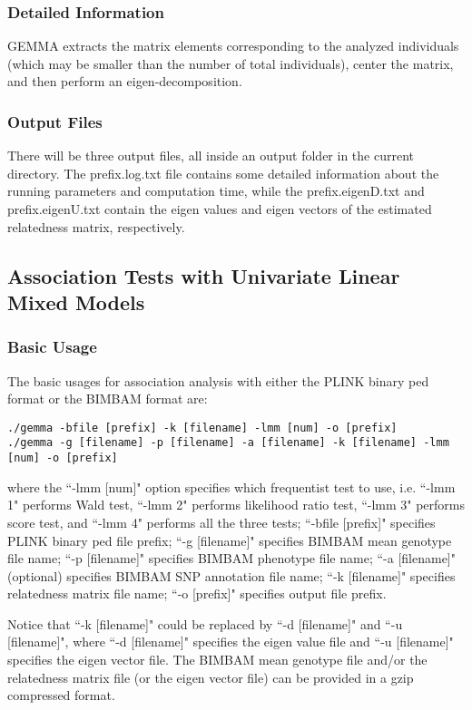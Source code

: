 \documentclass[11pt]{article}
\begin{document}
\subsubsection{Detailed Information}
GEMMA extracts the matrix elements corresponding to the analyzed individuals (which may be smaller than the number of total individuals), center the matrix, and then perform an eigen-decomposition. 



\subsubsection{Output Files}
There will be three output files, all inside an output folder in the current directory. The prefix.log.txt file contains some detailed information about the running parameters and computation time, while the prefix.eigenD.txt and prefix.eigenU.txt contain the eigen values and eigen vectors of the estimated relatedness matrix, respectively.

\subsection{Association Tests with Univariate Linear Mixed Models}
\subsubsection{Basic Usage}
The basic usages for association analysis with either the PLINK binary ped format or the BIMBAM format are:
\begin{verbatim}
./gemma -bfile [prefix] -k [filename] -lmm [num] -o [prefix]
./gemma -g [filename] -p [filename] -a [filename] -k [filename] -lmm [num] -o [prefix]
\end{verbatim}
where the ``-lmm [num]" option specifies which frequentist test to use, i.e. ``-lmm 1" performs Wald test, ``-lmm 2" performs likelihood ratio test, ``-lmm 3" performs score test, and ``-lmm 4" performs all the three tests; ``-bfile [prefix]" specifies PLINK binary ped file prefix; ``-g [filename]" specifies BIMBAM mean genotype file name; ``-p [filename]" specifies BIMBAM phenotype file name; ``-a [filename]" (optional) specifies BIMBAM SNP annotation file name; ``-k [filename]" specifies relatedness matrix file name; ``-o [prefix]" specifies output file prefix. 

Notice that ``-k [filename]" could be replaced by ``-d [filename]" and ``-u [filename]", where ``-d [filename]" specifies the eigen value file and ``-u [filename]" specifies the eigen vector file. The BIMBAM mean genotype file and/or the relatedness matrix file (or the eigen vector file) can be provided in a gzip compressed format.
\end{document}
